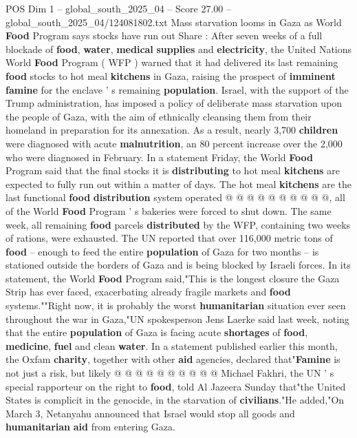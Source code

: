 \begin{textsample}{POS Dim 1 – global\_south\_2025\_04 – Score 27.00 – global\_south\_2025\_04/124081802.txt}  \label{ex:f1_pos_290}
Mass starvation looms in Gaza as World \textbf{Food} Program says stocks have run out Share : After seven weeks of a full blockade of \textbf{food}, \textbf{water}, \textbf{medical} \textbf{supplies} and \textbf{electricity}, the United Nations World \textbf{Food} Program ( WFP ) warned that it had delivered its last remaining \textbf{food} stocks to hot meal \textbf{kitchens} in Gaza, raising the prospect of \textbf{imminent} \textbf{famine} for the enclave ' s remaining \textbf{population}.
Israel, with the support of the Trump administration, has imposed a policy of deliberate mass starvation upon the people of Gaza, with the aim of ethnically cleansing them from their homeland in preparation for its annexation.
As a result, nearly 3,700 \textbf{children} were diagnosed with acute \textbf{malnutrition}, an 80 percent increase over the 2,000 who were diagnosed in February.
In a statement Friday, the World \textbf{Food} Program said that the final stocks it is \textbf{distributing} to hot meal \textbf{kitchens} are expected to fully run out within a matter of days.
The hot meal \textbf{kitchens} are the last functional \textbf{food} \textbf{distribution} system operated @ @ @ @ @ @ @ @ @ @, all of the World \textbf{Food} Program ' s bakeries were forced to shut down.
The same week, all remaining \textbf{food} parcels \textbf{distributed} by the WFP, containing two weeks of rations, were exhausted.
The UN reported that over 116,000 metric tons of \textbf{food} -- enough to feed the entire \textbf{population} of Gaza for two months -- is stationed outside the borders of Gaza and is being blocked by Israeli forces.
In its statement, the World \textbf{Food} Program said,"This is the longest closure the Gaza Strip has ever faced, exacerbating already fragile markets and \textbf{food} systems.""Right now, it is probably the worst \textbf{humanitarian} situation ever seen throughout the war in Gaza,"UN spokesperson Jens Laerke said last week, noting that the entire \textbf{population} of Gaza is facing acute \textbf{shortages} of \textbf{food}, \textbf{medicine}, \textbf{fuel} and clean \textbf{water}.
In a statement published earlier this month, the Oxfam \textbf{charity}, together with other \textbf{aid} agencies, declared that"\textbf{Famine} is not just a risk, but likely @ @ @ @ @ @ @ @ @ @ Michael Fakhri, the UN ' s special rapporteur on the right to \textbf{food}, told Al Jazeera Sunday that"the United States is complicit in the genocide, in the starvation of \textbf{civilians}."He added,"On March 3, Netanyahu announced that Israel would stop all goods and \textbf{humanitarian} \textbf{aid} from entering Gaza.

\end{textsample}
